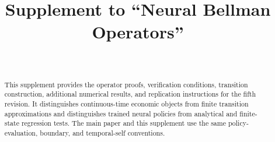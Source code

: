 \documentclass[ecta]{econsocart}
\begin{document}
\begin{frontmatter}
\title{Supplement to ``Neural Bellman Operators''}
\begin{aug}
\author[id=au1,addressref={add1}]{~}
\address[id=add1]{}
\end{aug}
\begin{abstract}
This supplement provides the operator proofs, verification conditions, transition construction, additional numerical results, and replication instructions for the fifth revision. It distinguishes continuous-time economic objects from finite transition approximations and distinguishes trained neural policies from analytical and finite-state regression tests. The main paper and this supplement use the same policy-evaluation, boundary, and temporal-self conventions.
\end{abstract}
\end{frontmatter}









\end{document}
